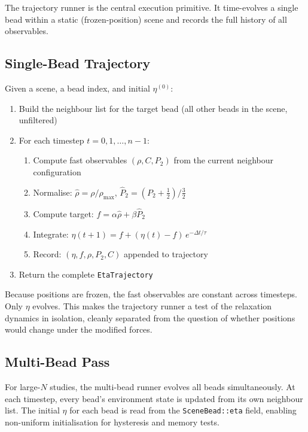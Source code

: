 \documentclass[11pt]{article}
\newcommand{\type}[1]{\texttt{#1}}
\begin{document}
The trajectory runner is the central execution primitive.  It time-evolves
a single bead within a static (frozen-position) scene and records the full
history of all observables.

\subsection{Single-Bead Trajectory}

Given a scene, a bead index, and initial $\eta^{(0)}$:

\begin{enumerate}
    \item Build the neighbour list for the target bead (all other beads
          in the scene, unfiltered)
    \item For each timestep $t = 0, 1, \ldots, n{-}1$:
    \begin{enumerate}
        \item Compute fast observables $(\rho, C, P_2)$ from the current
              neighbour configuration
        \item Normalise: $\hat{\rho} = \rho / \rho_{\max}$,
              $\hat{P}_2 = (P_2 + \tfrac{1}{2}) / \tfrac{3}{2}$
        \item Compute target: $f = \alpha\hat{\rho} + \beta\hat{P}_2$
        \item Integrate: $\eta(t{+}1) = f + (\eta(t) - f)\,
              e^{-\Delta t / \tau}$
        \item Record: $(\eta, f, \rho, P_2, C)$ appended to trajectory
    \end{enumerate}
    \item Return the complete \type{EtaTrajectory}
\end{enumerate}

Because positions are frozen, the fast observables are constant across
timesteps.  Only $\eta$ evolves.  This makes the trajectory runner a test
of the relaxation dynamics in isolation, cleanly separated from the
question of whether positions would change under the modified forces.

\subsection{Multi-Bead Pass}

For large-$N$ studies, the multi-bead runner evolves all beads
simultaneously.  At each timestep, every bead's environment state is
updated from its own neighbour list.  The initial $\eta$ for each bead is
read from the \type{SceneBead::eta} field, enabling non-uniform
initialisation for hysteresis and memory tests.
\end{document}
